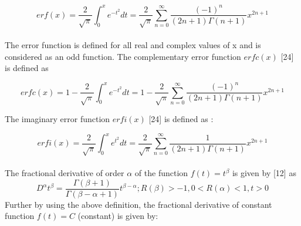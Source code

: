 \documentclass[leqno]{article}
\begin{document}
\begin{equation}
    erf(x)=
    \frac{2}{\sqrt{\pi}}
    \int_0^{x}{e^{-t^2}}dt
    =\frac{2}{\sqrt{\pi}}
    \sum_{n = 0}^{\infty}
    \frac{{(-1)}^n}{(2n+1)\Gamma{(n+1)}}
    x^{2n+1}
\end{equation}
\paragraph{}
The error function is defined for all real and complex values of x and is considered as an odd function.
The complementary error function $erfc(x)$ [24] is defined as

\begin{equation}
    erfc(x)=
    1-\frac{2}{\sqrt{\pi}}
    \int_0^{x}{e^{-t^2}}dt
    =1-\frac{2}{\sqrt{\pi}}
    \sum_{n = 0}^{\infty}
    \frac{{(-1)}^n}{(2n+1)\Gamma{(n+1)}}
    x^{2n+1}
\end{equation}

The imaginary error function $erfi(x)$ [24] is defined as :

\begin{equation}
    erfi(x)=
    \frac{2}{\sqrt{\pi}}
    \int_0^{x}{e^{t^2}}dt
    =\frac{2}{\sqrt{\pi}}
    \sum_{n = 0}^{\infty}
    \frac{{1}}{(2n+1)\Gamma{(n+1)}}
    x^{2n+1}
\end{equation}
\\
The fractional derivative of order $\alpha$ of the function $f(t) = t^{\beta}$ is given by [12] as\\ 
\begin{equation}
    D^{\alpha}t^{\beta}=
    \frac{\Gamma{(\beta + 1)}}{\Gamma{(\beta - \alpha + 1)}}
    t^{\beta - \alpha};
    R(\beta) > -1, 0
    < R(\alpha) < 1, t > 0
\end{equation}
Further by using the above definition, the fractional derivative of constant function $f(t) = C$ (constant) is given by:
\end{document}
